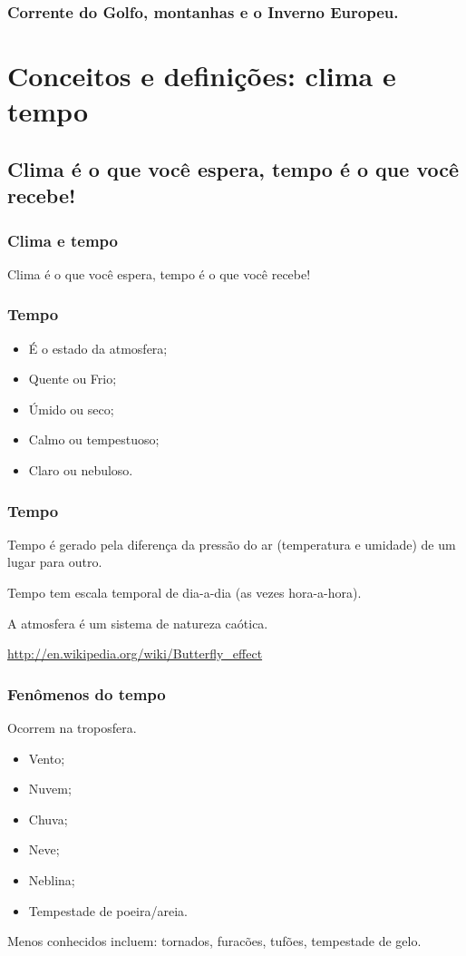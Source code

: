 \begin{frame}
\frametitle{Corrente do Golfo, montanhas e o Inverno Europeu.}
\end{frame}

\section{Conceitos e definições: clima e tempo}
\subsection{Clima é o que você espera, tempo é o que você recebe!}

\begin{frame}
\frametitle{Clima e tempo}
  \begin{block}{}
    Clima é o que você espera, tempo é o que você recebe!
  \end{block}
\end{frame}

\begin{frame}
\frametitle{Tempo}
  \begin{itemize}[<+-| alert@+>]
    \item É o estado da atmosfera;
    \item Quente ou Frio;
    \item Úmido ou seco;
    \item Calmo ou tempestuoso;
    \item Claro ou nebuloso.
  \end{itemize}
\end{frame}

\begin{frame}
\frametitle{Tempo}
  \begin{block}{}
    Tempo é gerado pela diferença da pressão do ar (temperatura e umidade) de
    um lugar para outro.
  \end{block}
\pause
  \begin{block}{}
    Tempo tem escala temporal de dia-a-dia (as vezes hora-a-hora).
  \end{block}
\pause
  \begin{block}{}
     A atmosfera é um sistema de natureza caótica.
  \end{block}
\hfill \url{http://en.wikipedia.org/wiki/Butterfly_effect}
\end{frame}

\begin{frame}
\frametitle{Fenômenos do tempo}
Ocorrem na troposfera.
  \begin{itemize}[<+-| alert@+>]
    \item Vento;
    \item Nuvem;
    \item Chuva;
    \item Neve;
    \item Neblina;
    \item Tempestade de poeira/areia.
  \end{itemize}
\pause
{\scriptsize Menos conhecidos incluem: tornados, furacões, tufões,
tempestade de gelo.}
\end{frame}

